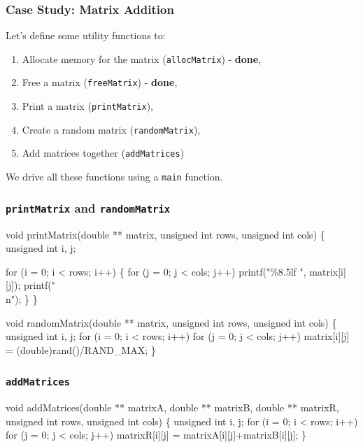 \documentclass[table]{beamer}
\newif\ifschigh\schighfalse
\newcommand{\kw}[1]{\ifschigh\textcolor{red}{#1}\else\textcolor{keyword}{#1}\fi}
\newcommand{\kt}[1]{\ifschigh\textcolor{red}{#1}\else\textcolor{ctext}{#1}\fi}
\newcounter{sckll}
\newcommand{\kr}{\setcounter{sckll}{1}}
\newcommand{\kl}{}
\begin{document}
\begin{frame}
\frametitle{Case Study: Matrix Addition}
Let's define some utility functions to:
\begin{enumerate}
\item Allocate memory for the matrix ({\tt allocMatrix}) - {\bf done},
\item Free a matrix ({\tt freeMatrix}) - {\bf done},
\item Print a matrix ({\tt printMatrix}),
\item Create a random matrix ({\tt randomMatrix}),
\item Add matrices together ({\tt addMatrices})
\end{enumerate}
We drive all these functions using a {\tt main} function.
\end{frame}

\begin{frame}[fragile]
\frametitle{{\tt printMatrix} and {\tt randomMatrix}}
\begin{semiverbatim}
\scriptsize
\kr\kl\kw{void} printMatrix(\kw{double} ** matrix, \kw{unsigned int} rows,
\kl                                   \kw{unsigned int} cols)
\kl\{
\kl   \kw{unsigned int} i, j;
\kl
\kl   \kw{for} (i = 0; i < rows; i++)
\kl   \{
\kl      \kw{for} (j = 0; j < cols; j++)
\kl         printf(\kt{"\%8.5lf "}, matrix[i][j]);
\kl      printf(\kt{"\\n"});
\kl   \}
\kl\}
\end{semiverbatim}

\begin{semiverbatim}
\scriptsize
\kr\kl\kw{void} randomMatrix(\kw{double} ** matrix, \kw{unsigned int} rows,
\kl                                    \kw{unsigned int} cols)
\kl\{
\kl   \kw{unsigned int} i, j;
\kl   \kw{for} (i = 0; i < rows; i++)
\kl      \kw{for} (j = 0; j < cols; j++)
\kl         matrix[i][j] = (\kw{double})rand()/RAND_MAX;
\kl\}
\end{semiverbatim}
\end{frame}

\begin{frame}[fragile]
\frametitle{{\tt addMatrices}}
\begin{semiverbatim}
\scriptsize
\kr\kl\kw{void} addMatrices(\kw{double} ** matrixA, \kw{double} ** matrixB,
\kl                 \kw{double} ** matrixR,
\kl                 \kw{unsigned int} rows, \kw{unsigned int} cols)
\kl\{
\kl   \kw{unsigned int} i, j;
\kl   \kw{for} (i = 0; i < rows; i++)
\kl      \kw{for} (j = 0; j < cols; j++)
\kl         matrixR[i][j] = matrixA[i][j]+matrixB[i][j];
\kl\}
\end{semiverbatim}
\end{frame}
\end{document}
